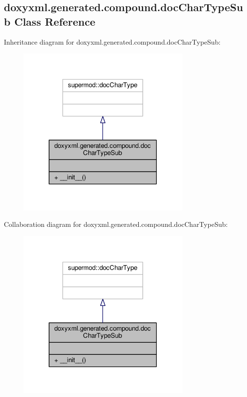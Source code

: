 \subsection{doxyxml.\+generated.\+compound.\+doc\+Char\+Type\+Sub Class Reference}
\label{classdoxyxml_1_1generated_1_1compound_1_1docCharTypeSub}


Inheritance diagram for doxyxml.\+generated.\+compound.\+doc\+Char\+Type\+Sub\+:
\nopagebreak
\begin{figure}[H]
\begin{center}
\leavevmode
\includegraphics[width=246pt]{df/d67/classdoxyxml_1_1generated_1_1compound_1_1docCharTypeSub__inherit__graph}
\end{center}
\end{figure}


Collaboration diagram for doxyxml.\+generated.\+compound.\+doc\+Char\+Type\+Sub\+:
\nopagebreak
\begin{figure}[H]
\begin{center}
\leavevmode
\includegraphics[width=246pt]{d0/d12/classdoxyxml_1_1generated_1_1compound_1_1docCharTypeSub__coll__graph}
\end{center}
\end{figure}
